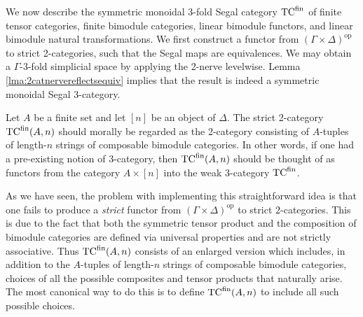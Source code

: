 \documentclass{amsart}
\begin{document}
We now describe the symmetric monoidal 3-fold Segal category ${\mathrm{TC}^{\text{fin}}}$ of finite tensor categories, finite bimodule categories, linear bimodule functors, and linear bimodule natural transformations. We first construct a functor from $(\Gamma \times \Delta)^\textrm{op}$ to strict 2-categories, such that the Segal maps are equivalences. We may obtain a $\Gamma$-3-fold simplicial space by applying the 2-nerve levelwise.   Lemma \ref{lma:2catnervereflectsequiv} implies that the result is indeed a symmetric monoidal  Segal 3-category.  

Let $A$ be a finite set and let $[n]$ be an object of $\Delta$. The strict 2-category ${\mathrm{TC}^{\text{fin}}}(A,n)$ should morally be regarded as the 2-category consisting of $A$-tuples of length-$n$ strings of composable bimodule categories. In other words, if one had a pre-existing notion of 3-category, then ${\mathrm{TC}^{\text{fin}}}(A,n)$ should be thought of as  functors from the category $A \times [n]$ into the weak 3-category ${\mathrm{TC}^{\text{fin}}}$.

As we have seen, the problem with implementing this straightforward idea is that one fails to produce a {\em strict} functor from $(\Gamma \times \Delta)^\textrm{op}$ to strict $2$-categories. This is due to the fact that both the symmetric tensor product and the composition of bimodule categories are defined via universal properties and are not strictly associative. Thus ${\mathrm{TC}^{\text{fin}}}(A,n)$ consists of an enlarged version which includes, in addition to the 
$A$-tuples of length-$n$ strings of composable bimodule categories, choices of all the possible composites and tensor products that naturally arise. The most canonical way to do this is to define ${\mathrm{TC}^{\text{fin}}}(A,n)$ to include all such possible choices. 



\end{document}
